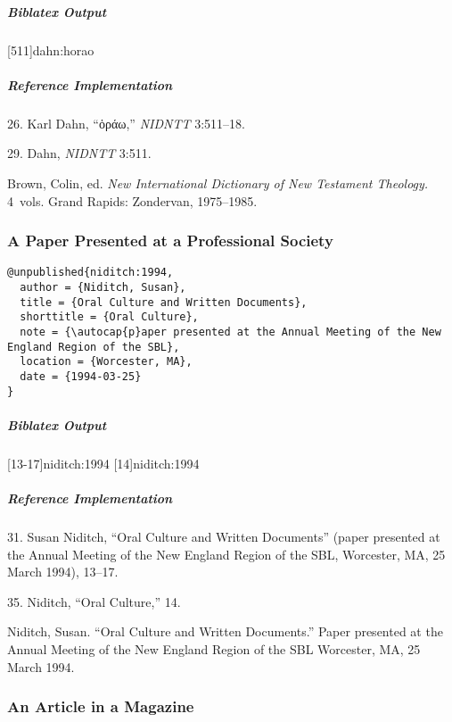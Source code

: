 \documentclass[a4paper]{article}
\newcommand{\gr}[1]{{\greekfont #1}}
\newenvironment{biboutput}{%
  \subparagraph{Biblatex Output}
}{\color{black}}
\newenvironment{refimp}{%
  \subparagraph{Reference Implementation}
  \color{reference-colour}
  \rm
}{\par\color{black}}
\begin{document}
\begin{biboutput}
  [511]{dahn:horao}
\end{biboutput}

\begin{refimp}
  26. Karl Dahn, “\gr{ὁράω},” \emph{NIDNTT} 3:511–18.

  29. Dahn, \emph{NIDNTT} 3:511.

  \hangindent\bibindent Brown, Colin, ed. \emph{New International Dictionary
  of New Testament Theology.} 4~vols. Grand Rapids: Zondervan, 1975–1985.

\end{refimp}

\subsubsection{A Paper Presented at a Professional Society}

\begin{lstlisting}
@unpublished{niditch:1994,
  author = {Niditch, Susan},
  title = {Oral Culture and Written Documents},
  shorttitle = {Oral Culture},
  note = {\autocap{p}aper presented at the Annual Meeting of the New England Region of the SBL},
  location = {Worcester, MA},
  date = {1994-03-25}
}
\end{lstlisting}

\begin{biboutput}
  [13-17]{niditch:1994}
  [14]{niditch:1994}
\end{biboutput}

\begin{refimp}
  31. Susan Niditch, “Oral Culture and Written Documents” (paper presented at
  the Annual Meeting of the New England Region of the SBL, Worcester, MA, 25
  March 1994), 13–17.

  35. Niditch, “Oral Culture,” 14.

  \hangindent\bibindent Niditch, Susan. “Oral Culture and Written Documents.”
  Paper presented at the Annual Meeting of the New England Region of the SBL
  Worcester, MA, 25 March 1994.
\end{refimp}

\subsubsection{An Article in a Magazine}
\end{document}
